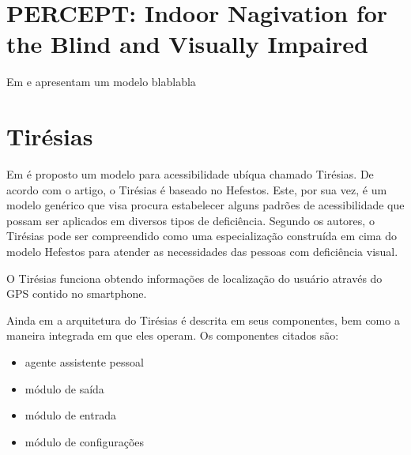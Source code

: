 \documentclass[english,brazilian]{UNISINOSmonografia}
\begin{document}
	\section{PERCEPT: Indoor Nagivation for the Blind and Visually Impaired}
Em  e  apresentam um modelo blablabla

		\cite{Ganz2011}

			
		\cite{Ganz2012}


	\section{Tirésias}
	Em  é proposto um modelo para acessibilidade ubíqua chamado Tirésias. De acordo com o artigo, o Tirésias é baseado no Hefestos. Este, por sua vez, é um modelo genérico que visa procura estabelecer alguns padrões de acessibilidade que possam ser aplicados em diversos tipos de deficiência. Segundo os autores, o Tirésias pode ser compreendido como uma especialização construída em cima do modelo Hefestos para atender as necessidades das pessoas com deficiência visual. 

	O Tirésias funciona obtendo informações de localização do usuário através do GPS contido no smartphone.

	Ainda em  a arquitetura do Tirésias é descrita em seus componentes, bem como a maneira integrada em que eles operam. Os componentes citados são:

	\begin{itemize} 
		\item agente assistente pessoal
		\item módulo de saída
		\item módulo de entrada
		\item módulo de configurações
	\end{itemize}
\end{document}
